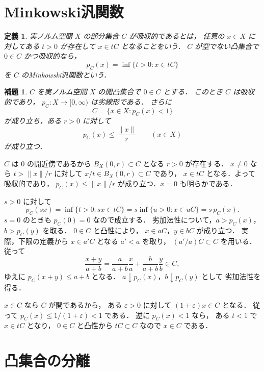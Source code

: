 \documentclass[a5paper,10pt,onecolumn]{jsarticle}
\makeatletter
\theoremstyle{mathnotetheorem}
\newtheorem{definition}[theorem]{定義}
\newtheorem{lemma}[theorem]{補題}
\renewcommand{\proofname}{証明}
\renewenvironment{proof}[1][\proofname]{%
  \par\pushQED{\qed}\normalfont\topsep4\p@\@plus2\p@\relax
  \trivlist\item[\hskip\labelsep\bfseries #1]\ignorespaces
}{\popQED\endtrivlist\@endpefalse}
\makeatother
\begin{document}
\section{Minkowski汎関数}

\begin{definition}
実ノルム空間 $X$ の部分集合 $C$ が\emph{吸収的}であるとは，
任意の $x\in X$ に対してある $t>0$ が存在して
$x\in tC$ となることをいう．
$C$ が空でない凸集合で $0\in C$ かつ吸収的なら，
\[
 p_C(x)=\inf\{t>0:x\in tC\}
\]
を $C$ の\emph{Minkowski汎関数}という．
\end{definition}

\begin{lemma}\label{lem:gauge}
$C$ を実ノルム空間 $X$ の開凸集合で $0\in C$ とする．
このとき $C$ は吸収的であり，
$p_C:X\to[0,\infty)$ は劣線形である．
さらに
\[
 C=\{x\in X:p_C(x)<1\}
\]
が成り立ち，ある $r>0$ に対して
\[
 p_C(x)\le\frac{\|x\|}{r}\qquad(x\in X)
\]
が成り立つ．
\end{lemma}
\begin{proof}
$C$ は $0$ の開近傍であるから
$B_X(0,r)\subset C$ となる $r>0$ が存在する．
$x\ne0$ なら $t>\|x\|/r$ に対して
$x/t\in B_X(0,r)\subset C$ であり，
$x\in tC$ となる．よって吸収的であり，
$p_C(x)\le\|x\|/r$ が成り立つ．$x=0$ も明らかである．

$s>0$ に対して
\[
 p_C(sx)=\inf\{t>0:sx\in tC\}
 =s\inf\{u>0:x\in uC\}=s\,p_C(x).
\]
$s=0$ のときも $p_C(0)=0$ なので成立する．
劣加法性について，$a>p_C(x)$，$b>p_C(y)$ を取る．
$0\in C$ と凸性により，
$x\in aC$，$y\in bC$ が成り立つ．
実際，下限の定義から $x\in a'C$ となる $a'<a$ を取り，
$(a'/a)C\subset C$ を用いる．
従って
\[
 \frac{x+y}{a+b}
 =\frac a{a+b}\frac xa+\frac b{a+b}\frac yb\in C,
\]
ゆえに $p_C(x+y)\le a+b$ となる．
$a\downarrow p_C(x)$，$b\downarrow p_C(y)$ として
劣加法性を得る．

$x\in C$ なら $C$ が開であるから，
ある $\varepsilon>0$ に対して
$(1+\varepsilon)x\in C$ となる．
従って $p_C(x)\le1/(1+\varepsilon)<1$ である．
逆に $p_C(x)<1$ なら，
ある $t<1$ で $x\in tC$ となり，
$0\in C$ と凸性から $tC\subset C$ なので $x\in C$ である．
\end{proof}

\section{凸集合の分離}
\end{document}
